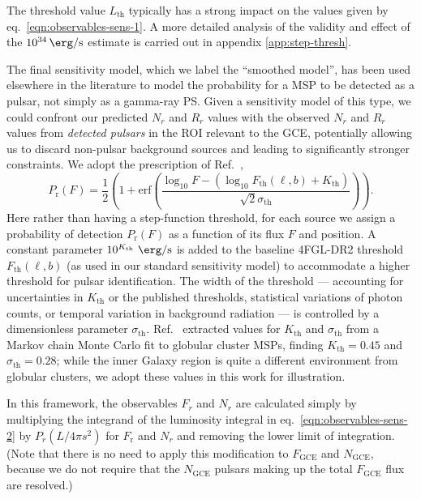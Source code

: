 \documentclass[letter,11pt]{article}
\newcommand{\parens}[1]{\left(#1\right)}
\begin{document}
The threshold value $L_\text{th}$ typically has a strong impact on the values given by eq.~\ref{eqn:observables-sens-1}. A more detailed analysis of the validity and effect of the $\SI{e34}{\erg\per\second}$ estimate is carried out in appendix \ref{app:step-thresh}.

The final sensitivity model, which we label the ``smoothed model'', has been used elsewhere in the literature to model the probability for a MSP to be detected as a pulsar, not simply as a gamma-ray PS. Given a sensitivity model of this type, we could confront our predicted $N_r$ and $R_r$ values with the observed $N_r$ and $R_r$ values from {\it detected pulsars} in the ROI relevant to the GCE, potentially allowing us to discard non-pulsar background sources and leading to significantly stronger constraints. We adopt the prescription of Ref.~\cite{Ploeg:2020jeh}, 
\begin{equation}
    P_\text{r}(F) = \frac{1}{2} \parens{1 + \text{erf} \parens{\frac{\log_{10} F - (\log_{10} F_\text{th}(\ell, b) + K_\text{th})}{\sqrt{2}\sigma_\text{th}}}}.
    \label{eqn:ploeg-smoothing}
\end{equation}
Here rather than having a step-function threshold, for each source we assign a probability of detection $P_\text{r}(F)$ as a function of its flux $F$ and position. A constant parameter $10^{K_\text{th}}\ \SI{}{\erg\per\second}$ is added to the baseline 4FGL-DR2 threshold $F_\text{th}(\ell, b)$ (as used in our standard sensitivity model) to accommodate a higher threshold for pulsar identification. The width of the threshold --- accounting for uncertainties in $K_\text{th}$ or the published thresholds, statistical variations of photon counts, or temporal variation in background radiation --- is controlled by a dimensionless parameter $\sigma_\text{th}$. Ref.~\cite{Ploeg:2020jeh} extracted values for $K_\text{th}$ and $\sigma_\text{th}$ from a Markov chain Monte Carlo fit to globular cluster MSPs, finding $K_\text{th} = 0.45$ and $\sigma_\text{th} = 0.28$; while the inner Galaxy region is quite a different environment from globular clusters, we adopt these values in this work for illustration. 

In this framework, the observables $F_r$ and $N_r$ are calculated simply by multiplying the integrand of the luminosity integral in eq.~\ref{eqn:observables-sens-2} by $P_r(L/4\pi s^2)$ for $F_\text{r}$ and $N_r$ and removing the lower limit of integration. (Note that there is no need to apply this modification to $F_\text{GCE}$ and $N_\text{GCE}$, because we do not require that the $N_\text{GCE}$ pulsars making up the total $F_\text{GCE}$ flux are resolved.)
\end{document}
